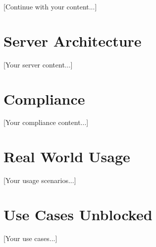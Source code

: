 \documentclass[11pt,a4paper]{article}
\begin{document}
[Continue with your content...]

\section{Server Architecture}
[Your server content...]

\section{Compliance}
[Your compliance content...]

\section{Real World Usage}
[Your usage scenarios...]

\section{Use Cases Unblocked}
[Your use cases...]
\end{document}

